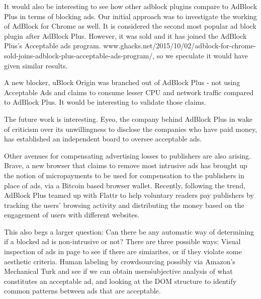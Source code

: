 It would also be interesting to see how other adblock plugins compare to AdBlock Plus in terms of blocking ads. Our initial approach was to investigate the working of AdBlock for Chrome as well. It is considered the second most popular ad block plugin after AdBlock Plus. However, it was sold and it has joined the AdBlock Plus's Acceptable ads program.
 www.ghacks.net/2015/10/02/adblock-for-chrome-sold-joins-adblock-plus-acceptable-ads-program/, so we speculate it would have given similar results.
 
 A new blocker, uBlock Origin was branched out of AdBlock Plus - not using Acceptable Ads and claims to consume lesser CPU and network traffic compared to AdBlock Plus. It would be interesting to validate those claims.

The future work is interesting. Eyeo, the company behind AdBlock Plus in wake of criticism over its unwillingness to disclose the companies who have paid money, has established an independent board to oversee acceptable ads.

Other avenues for compensating advertising losses to publishers are also arising. Brave, a new browser that claims to remove most intrusive ads has brought up the notion of micropayments to be used for compensation to the publishers in place of ads, via a Bitcoin based browser wallet. Recently, following the trend, AdBlock Plus teamed up with Flattr to help voluntary readers pay publishers by tracking the users' browsing activity and distributing the money based on the engagement of users with different websites.

This also begs a larger question: Can there be any automatic way of determining if a blocked ad is non-intrusive or not?
There are three possible ways: 
Visual inspection of ads in page to see if there are simiarites, or if they violate some aesthetic criteria.
Human labeling by crowdsourcing possibly via Amazon's Mechanical Turk and see if we can obtain users\' subjective analysis of what constitutes an acceptable ad, and looking at the DOM structure to identify common patterns between ads that are acceptable.

